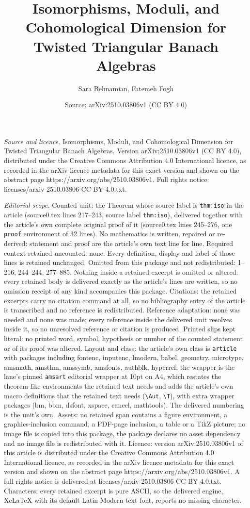 \documentclass[10pt,a4paper]{amsart}
\title[Isomorphisms, Moduli, and Cohomological Dimension for Twiste]{Isomorphisms, Moduli, and Cohomological Dimension for Twisted Triangular Banach Algebras}
\author{Sara Behnamian, Fatemeh Fogh}
\date{Source: arXiv:2510.03806v1 (CC BY 4.0)}
\begin{document}
\maketitle

\noindent\emph{Source and licence.} Isomorphisms, Moduli, and Cohomological Dimension for Twisted Triangular Banach Algebras. Version arXiv:2510.03806v1 (CC BY 4.0), distributed under the Creative Commons Attribution 4.0 International licence, as recorded in the arXiv licence metadata for this exact version and shown on the abstract page https://arxiv.org/abs/2510.03806v1. Full rights notice: licenses/arxiv-2510.03806-CC-BY-4.0.txt.\par\smallskip

\noindent\textit{Editorial scope.} Counted unit: the Theorem whose source label is \texttt{thm:iso} in the article (source0.tex lines 217--243, source label \texttt{thm:iso}), delivered together with the article's own complete original proof of it (source0.tex lines 245--276, one \texttt{proof} environment of 32 lines). No mathematics is written, repaired or re-derived: statement and proof are the article's own text line for line. Required context retained uncounted: none. Every definition, display and label of those lines is retained unchanged. Omitted from this package and not redistributed: 1--216, 244--244, 277--885. Nothing inside a retained excerpt is omitted or altered: every retained body is delivered exactly as the article's lines are written, so no omission receipt of any kind accompanies this package. Citations: the retained excerpts carry no citation command at all, so no bibliography entry of the article is transcribed and no reference is redistributed. Reference adaptation: none was needed and none was made; every reference inside the delivered unit resolves inside it, so no unresolved reference or citation is produced. Printed slips kept literal: no printed word, symbol, hypothesis or number of the counted statement or of its proof was altered. Layout and class: the article's own class is \texttt{article} with packages including fontenc, inputenc, lmodern, babel, geometry, microtype, amsmath, amsthm, amssymb, amsfonts, authblk, hyperref; the wrapper is the lane's pinned \texttt{amsart} editorial wrapper at 10pt on A4, which restates the theorem-like environments the retained text needs and adds the article's own macro definitions that the retained text needs (\texttt{\textbackslash Aut}, \texttt{\textbackslash T}), with extra wrapper packages (bm, bbm, dsfont, xspace, cancel, mathtools). The delivered numbering is the unit's own. Assets: no retained span contains a figure environment, a graphics-inclusion command, a PDF-page inclusion, a table or a TikZ picture; no image file is copied into this package, the package declares no asset dependency and no image file is redistributed with it. Licence: version arXiv:2510.03806v1 of this article is distributed under the Creative Commons Attribution 4.0 International licence, as recorded in the arXiv licence metadata for this exact version and shown on the abstract page https://arxiv.org/abs/2510.03806v1. A full rights notice is delivered at licenses/arxiv-2510.03806-CC-BY-4.0.txt. Characters: every retained excerpt is pure ASCII, so the delivered engine, XeLaTeX with its default Latin Modern text font, reports no missing character.
\end{document}
